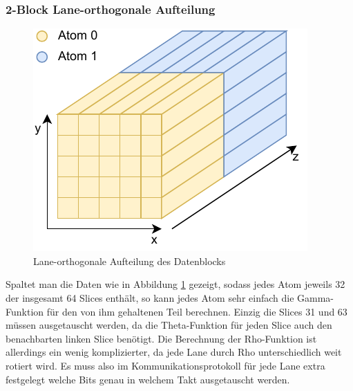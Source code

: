 \subsubsection{2-Block Lane-orthogonale Aufteilung}
\begin{figure}
    \center
    \includegraphics{images/Laneorthogonal.pdf}
    \caption{Lane-orthogonale Aufteilung des Datenblocks}
    \label{fig:2_block_laneorthogonal}
\end{figure}
Spaltet man die Daten wie in Abbildung \ref{fig:2_block_laneorthogonal} gezeigt, sodass jedes Atom jeweils 32 der insgesamt 64 Slices enthält,
so kann jedes Atom sehr einfach die Gamma-Funktion für den von ihm gehaltenen Teil berechnen. Einzig die Slices 31 und 63 müssen ausgetauscht werden,
da die Theta-Funktion für jeden Slice auch den benachbarten linken Slice benötigt. Die Berechnung der Rho-Funktion ist allerdings ein wenig komplizierter,
da jede Lane durch Rho unterschiedlich weit rotiert wird. Es muss also im Kommunikationsprotokoll für jede Lane extra festgelegt welche Bits genau in welchem
Takt ausgetauscht werden.

